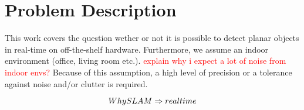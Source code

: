 \documentclass[main.tex]{subfiles}
\begin{document}
\section{Problem Description}

This work covers the question wether or not it is possible to detect planar objects in real-time on off-the-shelf hardware.
Furthermore, we assume an indoor environment (office, living room etc.). \textcolor{red}{explain why i expect a lot of noise from indoor envs?} Because of this assumption, a high level of precision or a tolerance against noise and/or
clutter is required.

\[Why \space SLAM \Rightarrow realtime \]
\end{document}
